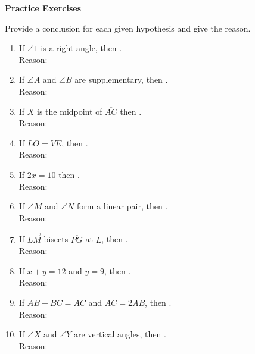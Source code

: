 \textbf{Practice Exercises}

\vspce

Provide a conclusion for each given hypothesis and give the reason. 

\begin{enumerate}[label = \arabic*. ]
\item If $\angle{1} $ is a right angle, then \blank. \\
Reason: \blank 
\item If $\angle{A} $ and $\angle{B} $ are supplementary, then \blank. \\
Reason: \blank 
\item If $X$ is the midpoint of $\overline{AC} $ then \blank. \\
Reason: \blank 
\item If $LO = VE$,  then \blank. \\
Reason: \blank 
\item If $2x = 10$ then \blank. \\
Reason: \blank 
\item If $\angle{M}$ and $\angle{N}$ form a linear pair, then \blank. \\
Reason: \blank 
\item If $\overrightarrow{LM} $ bisects $\overline{PG}$ at $L$, then \blank. \\
Reason: \blank 
\item If $x+y= 12$ and $y=9$, then \blank. \\
Reason: \blank 
\item If $AB + BC = AC$ and $AC= 2AB$, then \blank. \\
Reason: \blank 
\item If $\angle{X}$ and $\angle{Y}$ are vertical angles, then \blank. \\
Reason: \blank 
\end{enumerate} 